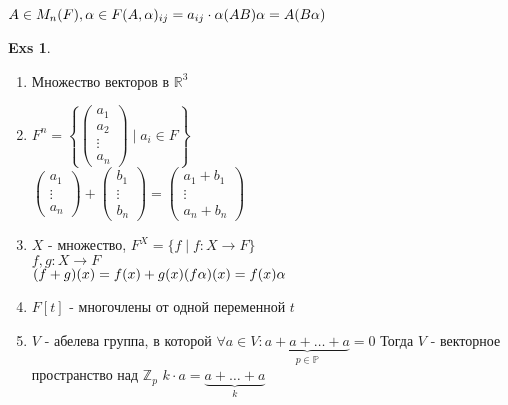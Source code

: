 \documentclass[11pt]{book}
\newcommand{\Z}{\mathbb{Z}}
\theoremstyle{definition}
\theoremstyle{plain}
\theoremstyle{plain}
\theoremstyle{definition}
\newtheorem*{exs}{Exs}
\theoremstyle{remark}
\begin{document}
$A \in M_n(F), \alpha \in F \\ (A, \alpha)_{ij} = a_{ij} \cdot \alpha \\ (AB)\alpha = A(B\alpha)$
\begin{exs}$ $
\begin{enumerate}
    \item Множество векторов в $\mathbb R ^3$
    \item $F^n = \left\{ \left( 
	\begin{array}{c} a_1 \\ a_2 \\ \vdots\\ a_n \end{array} \right) \mid a_i \in F \right\}$\\
	$\left(\begin{array}{c}
	    a_1 \\ \vdots \\ a_n 
	\end{array} \right) +
	\left( \begin{array}{c}
		b_1 \\ \vdots \\ b_n
	\end{array} \right)=
	\left( \begin{array}{c}
		a_1 + b_1 \\ \vdots \\ a_n + b_n
	\end{array} \right)$
    \item $X$ - множество, $F^X = \{f \mid f:X \to F\}$ \\
	$f, g: X \to F$\\
	$(f+g)(x) = f(x) + g(x)\\ (f \alpha) (x) = f(x)\alpha$
    \item $F[t]$ - многочлены от одной переменной $t$
    \item $V$ - абелева группа, в которой $\forall a \in V: \underbrace{a + a +\ldots + a}_{p \in \mathbb P} = 0$
	Тогда $V$ - векторное пространство над $\Z_p$
	$k \cdot a = \underbrace{a+ \ldots +a}_{k}$
\end{enumerate}
\end{exs}
\end{document}
